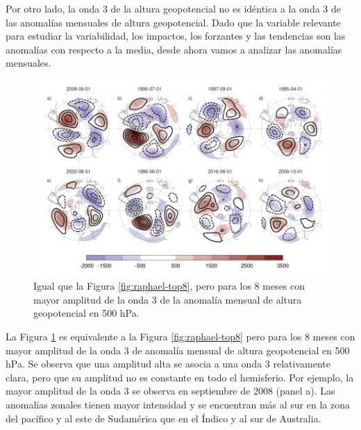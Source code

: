 \documentclass[12pt,oneside,a4paper]{reedthesis}
\begin{document}
Por otro lado, la onda 3 de la altura geopotencial no es idéntica a la onda 3 de las anomalías mensuales de altura geopotencial.
Dado que la variable relevante para estudiar la variabilidad, los impactos, los forzantes y las tendencias son las anomalías con respecto a la media, desde ahora vamos a analizar las anomalías mensuales.

\begin{figure}

{\centering \includegraphics{figures/15-onda3/zw3-top8-1} 

}

\caption{Igual que la Figura \ref{fig:raphael-top8}, pero para los 8 meses con mayor amplitud de la onda 3 de la anomalía mensual de altura geopotencial en 500 hPa.}\label{fig:zw3-top8}
\end{figure}



La Figura \ref{fig:zw3-top8} es equivalente a la Figura \ref{fig:raphael-top8} pero para los 8 meses con mayor amplitud de la onda 3 de anomalía mensual de altura geopotencial en 500 hPa.
Se observa que una amplitud alta se asocia a una onda 3 relativamente clara, pero que su amplitud no es constante en todo el hemisferio.
Por ejemplo, la mayor amplitud de la onda 3 se observa en septiembre de 2008 (panel a).
Las anomalías zonales tienen mayor intensidad y se encuentran más al sur en la zona del pacífico y al este de Sudamérica que en el Índico y al sur de Australia.
\end{document}
